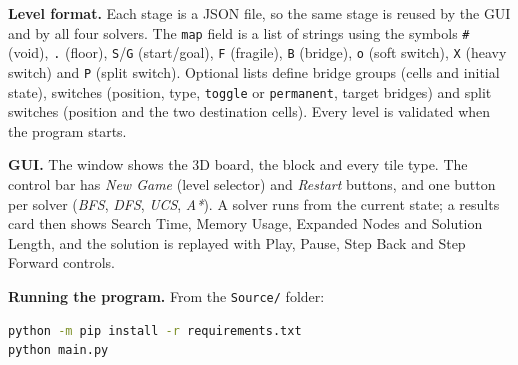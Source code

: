 \textbf{Level format.} Each stage is a JSON file, so the same stage is reused by the GUI and
by all four solvers. The \texttt{map} field is a list of strings using the symbols
\texttt{\#} (void), \texttt{.} (floor), \texttt{S}/\texttt{G} (start/goal), \texttt{F} (fragile),
\texttt{B} (bridge), \texttt{o} (soft switch), \texttt{X} (heavy switch) and \texttt{P}
(split switch). Optional lists define bridge groups (cells and initial state), switches
(position, type, \texttt{toggle} or \texttt{permanent}, target bridges) and split switches
(position and the two destination cells). Every level is validated when the program starts.

\textbf{GUI.} The window shows the 3D board, the block and every tile type. The control bar has
\emph{New Game} (level selector) and \emph{Restart} buttons, and one button per solver
(\emph{BFS}, \emph{DFS}, \emph{UCS}, \emph{A*}). A solver runs from the current state; a results
card then shows Search Time, Memory Usage, Expanded Nodes and Solution Length, and the solution is
replayed with Play, Pause, Step Back and Step Forward controls.

\textbf{Running the program.} From the \texttt{Source/} folder:
\begin{lstlisting}[language=bash, numbers=none]
python -m pip install -r requirements.txt
python main.py
\end{lstlisting}
